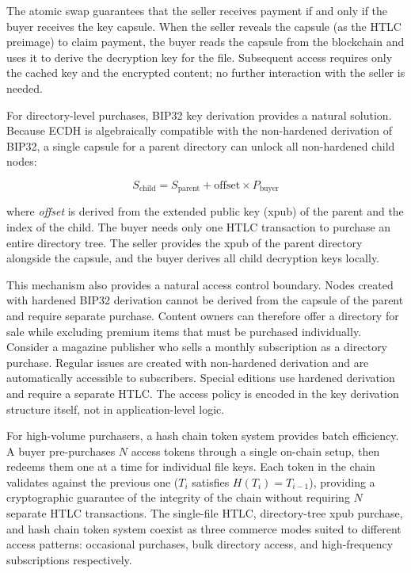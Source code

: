 \documentclass[11pt,a4paper]{article}
\begin{document}
The atomic swap guarantees that the seller receives payment if and only if the buyer receives the key capsule. When the seller reveals the capsule (as the HTLC preimage) to claim payment, the buyer reads the capsule from the blockchain and uses it to derive the decryption key for the file. Subsequent access requires only the cached key and the encrypted content; no further interaction with the seller is needed.

For directory-level purchases, BIP32 key derivation provides a natural solution. Because ECDH is algebraically compatible with the non-hardened derivation of BIP32, a single capsule for a parent directory can unlock all non-hardened child nodes:

\[
S_{\text{child}} = S_{\text{parent}} + \text{offset} \times P_{\text{buyer}}
\]

where \emph{offset} is derived from the extended public key (xpub) of the parent and the index of the child. The buyer needs only one HTLC transaction to purchase an entire directory tree. The seller provides the xpub of the parent directory alongside the capsule, and the buyer derives all child decryption keys locally.

This mechanism also provides a natural access control boundary. Nodes created with hardened BIP32 derivation cannot be derived from the capsule of the parent and require separate purchase. Content owners can therefore offer a directory for sale while excluding premium items that must be purchased individually. Consider a magazine publisher who sells a monthly subscription as a directory purchase. Regular issues are created with non-hardened derivation and are automatically accessible to subscribers. Special editions use hardened derivation and require a separate HTLC. The access policy is encoded in the key derivation structure itself, not in application-level logic.

For high-volume purchasers, a hash chain token system provides batch efficiency. A buyer pre-purchases $N$ access tokens through a single on-chain setup, then redeems them one at a time for individual file keys. Each token in the chain validates against the previous one ($T_i$ satisfies $H(T_i) = T_{i-1}$), providing a cryptographic guarantee of the integrity of the chain without requiring $N$ separate HTLC transactions. The single-file HTLC, directory-tree xpub purchase, and hash chain token system coexist as three commerce modes suited to different access patterns: occasional purchases, bulk directory access, and high-frequency subscriptions respectively.
\end{document}
